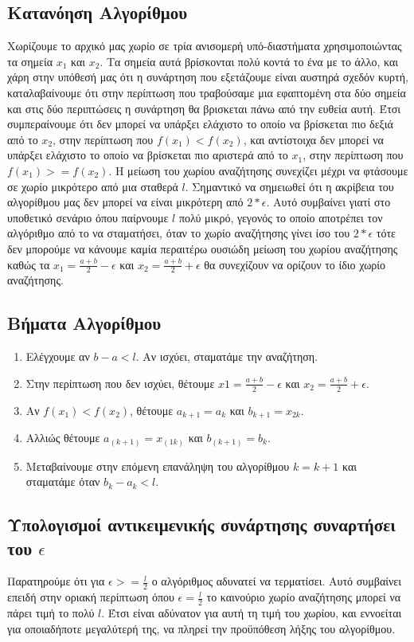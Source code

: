 \subsection{Κατανόηση Αλγορίθμου}

Χωρίζουμε το αρχικό μας χωρίο σε τρία ανισομερή υπό-διαστήματα χρησιμοποιώντας τα σημεία $x_1$ και $x_2$.
Τα σημεία αυτά βρίσκονται πολύ κοντά το ένα με το άλλο, και χάρη στην υπόθεσή μας ότι η συνάρτηση που
εξετάζουμε είναι αυστηρά σχεδόν κυρτή, καταλαβαίνουμε ότι στην περίπτωση που τραβούσαμε μια εφαπτομένη 
στα δύο σημεία και στις δύο περιπτώσεις η συνάρτηση θα βρισκεται πάνω από την ευθεία αυτή. Έτσι 
συμπεραίνουμε ότι δεν μπορεί να υπάρξει ελάχιστο το οποίο να βρίσκεται πιο δεξιά από το $x_2$, στην 
περίπτωση που $f(x_1) < f(x_2)$, και αντίστοιχα δεν μπορεί να υπάρξει ελάχιστο το οποίο να βρίσκεται πιο
αριστερά από το $x_1$, στην περίπτωση που $f(x_1) >= f(x_2)$. Η μείωση του χωρίου αναζήτησης συνεχίζει
μέχρι να φτάσουμε σε χωρίο μικρότερο από μια σταθερά $l$. Σημαντικό να σημειωθεί ότι η ακρίβεια του 
αλγορίθμου μας δεν μπορεί να είναι μικρότερη από $2*\epsilon$. Αυτό συμβαίνει γιατί στο υποθετικό σενάριο
όπου παίρνουμε $l$ πολύ μικρό, γεγονός το οποίο αποτρέπει τον αλγόριθμο από το να σταματήσει, όταν το
χωρίο αναζήτησης γίνει ίσο του $2*\epsilon$ τότε δεν μπορούμε να κάνουμε καμία περαιτέρω ουσιώδη μείωση
του χωρίου αναζήτησης καθώς τα $x_1=\frac{a+b}{2}-\epsilon$ και $x_2=\frac{a+b}{2}+\epsilon$ θα συνεχίζουν 
να ορίζουν το ίδιο χωρίο αναζήτησης.

\subsection{Βήματα Αλγορίθμου}

\begin{enumerate}
    \item Ελέγχουμε αν $b - a < l$. Αν ισχύει, σταματάμε την αναζήτηση.
    \item Στην περίπτωση που δεν ισχύει, θέτουμε $x1=\frac{a+b}{2}-\epsilon$ και
    $x_2=\frac{a+b}{2}+\epsilon$.
    \item Αν $f(x_1) < f(x_2)$, θέτουμε $a_{k+1}=a_k$ και $b_{k+1}=x_{2k}$.
    \item Αλλιώς θέτουμε $a_(k+1)=x_(1k)$ και $b_(k+1)=b_k$.
    \item Μεταβαίνουμε στην επόμενη επανάληψη του αλγορίθμου $k=k+1$ και σταματάμε όταν
    $b_k - a_k < l$.
\end{enumerate}

\subsection{Υπολογισμοί αντικειμενικής συνάρτησης συναρτήσει του $\epsilon$}
Παρατηρούμε ότι για $\epsilon >= \frac{l}{2}$ ο αλγόριθμος αδυνατεί να τερματίσει. Αυτό συμβαίνει
επειδή στην οριακή περίπτωση όπου $\epsilon = \frac{l}{2}$ το καινούριο χωρίο αναζήτησης μπορεί να 
πάρει τιμή το πολύ $l$. Έτσι είναι αδύνατον για αυτή τη τιμή του χωρίου, και εννοείται για οποιαδήποτε 
μεγαλύτερή της, να πληρεί την προϋπόθεση λήξης του αλγορίθμου.

